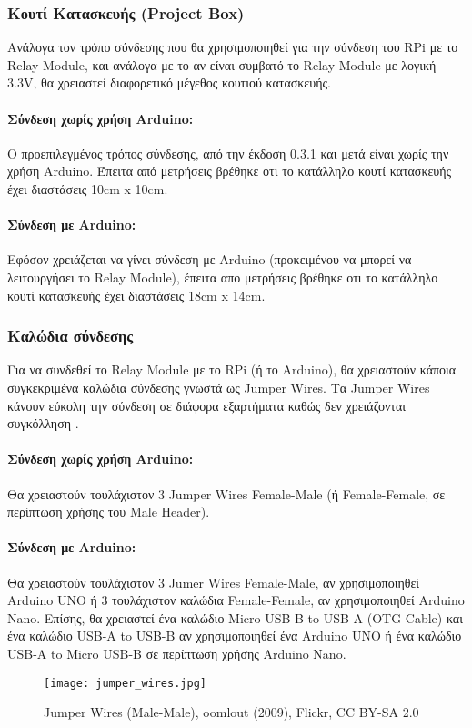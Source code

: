 		\subsubsection{Κουτί Κατασκευής (Project Box)}
			Ανάλογα τον τρόπο σύνδεσης που θα χρησιμοποιηθεί για την σύνδεση του RPi με το Relay Module, και ανάλογα με το αν είναι συμβατό το Relay Module με λογική 3.3V, θα χρειαστεί διαφορετικό μέγεθος κουτιού κατασκευής. 

			\paragraph{Σύνδεση χωρίς χρήση Arduino:}
				Ο προεπιλεγμένος τρόπος σύνδεσης, από την έκδοση 0.3.1 και μετά είναι χωρίς την χρήση Arduino. Έπειτα από μετρήσεις βρέθηκε οτι το κατάλληλο κουτί κατασκευής έχει διαστάσεις 10cm x 10cm.
			\paragraph{Σύνδεση με Arduino:}
				Εφόσον χρειάζεται να γίνει σύνδεση με Arduino (προκειμένου να μπορεί να λειτουργήσει το Relay Module), έπειτα απο μετρήσεις βρέθηκε οτι το κατάλληλο κουτί κατασκευής έχει διαστάσεις 18cm x 14cm.

		\subsubsection{Καλώδια σύνδεσης}
			Για να συνδεθεί το Relay Module με το RPi (ή το Arduino), θα χρειαστούν κάποια συγκεκριμένα καλώδια σύνδεσης γνωστά ως Jumper Wires. Τα Jumper Wires κάνουν εύκολη την σύνδεση σε διάφορα εξαρτήματα καθώς δεν χρειάζονται συγκόλληση \textsuperscript{\cite{jumper_wires}}.

		 	\paragraph{Σύνδεση χωρίς χρήση Arduino:}
		 		Θα χρειαστούν τουλάχιστον 3 Jumper Wires Female-Male (ή Female-Female, σε περίπτωση χρήσης του Male Header).
		 	\paragraph{Σύνδεση με Arduino:}
		 		\label{par:ard_conn}
		 		Θα χρειαστούν τουλάχιστον 3 Jumer Wires Female-Male, αν χρησιμοποιηθεί Arduino UNO ή 3 τουλάχιστον καλώδια Female-Female, αν χρησιμοποιηθεί Arduino Nano. Επίσης, θα χρειαστεί ένα καλώδιο Micro USB-B to USB-A (OTG Cable) και ένα καλώδιο USB-A to USB-B αν χρησιμοποιηθεί ένα Arduino UNO ή ένα καλώδιο USB-A to Micro USB-B σε περίπτωση χρήσης Arduino Nano.

		 	\begin{figure}[h]
			\centering
				\texttt{[image: jumper\_wires.jpg]}
				\caption{Jumper Wires (Male-Male), oomlout (2009), Flickr, CC BY-SA 2.0}
			\end{figure}